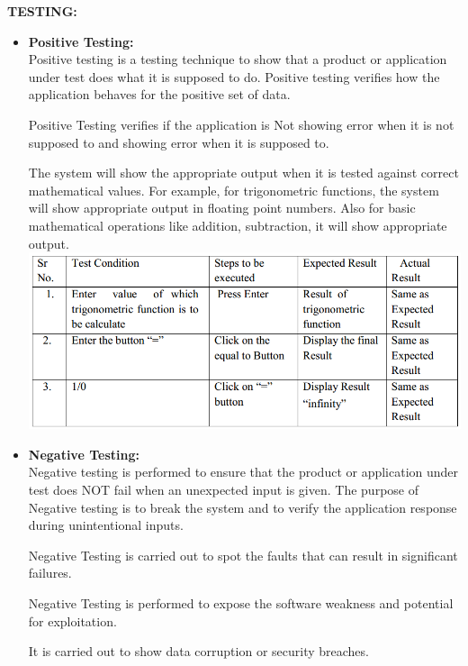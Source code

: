 \documentclass[a4paper,12pt]{article}
\begin{document}
\noindent \textbf{TESTING:}
\begin{itemize}
\item \textbf{Positive Testing:}\\
Positive testing is a testing technique to show that a product or application under test does what it is supposed to do. Positive testing verifies how the application behaves for the positive set of data.

Positive Testing verifies if the application is Not showing error when it is not supposed to and showing error when it is supposed to.

The system will show the appropriate output when it is tested against correct mathematical values. For example, for trigonometric functions, the system will show appropriate output in floating point numbers. Also for basic mathematical operations like addition, subtraction, it will show appropriate output.\\
\includegraphics[width=\textwidth]{trig_positive}
\\

\item \textbf{Negative Testing:}\\
Negative testing is performed to ensure that the product or application under test does NOT fail when an unexpected input is given. The purpose of Negative testing is to break the system and to verify the application response during unintentional inputs.

Negative Testing is carried out to spot the faults that can result in significant failures.

Negative Testing is performed to expose the software weakness and potential for exploitation.

It is carried out to show data corruption or security breaches.


\end{itemize}
\end{document}
